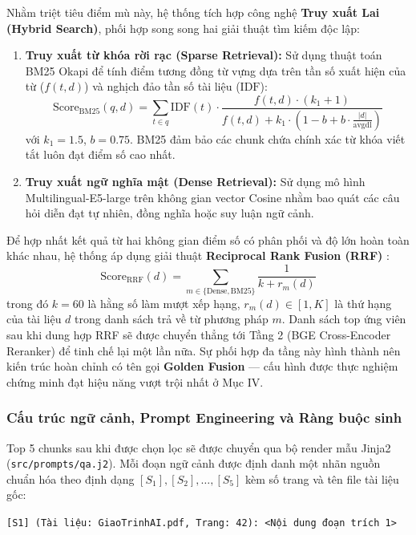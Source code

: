 ﻿\documentclass[12pt]{article}
\begin{document}
Nhằm triệt tiêu điểm mù này, hệ thống tích hợp công nghệ \textbf{Truy xuất Lai (Hybrid Search)}, phối hợp song song hai giải thuật tìm kiếm độc lập:
\begin{enumerate}
    \item \textbf{Truy xuất từ khóa rời rạc (Sparse Retrieval):} Sử dụng thuật toán BM25 Okapi \cite{robertson2009probabilistic} để tính điểm tương đồng từ vựng dựa trên tần số xuất hiện của từ ($f(t, d)$) và nghịch đảo tần số tài liệu ($\text{IDF}$):
    \begin{equation}
        \text{Score}_{\text{BM25}}(q, d) = \sum_{t \in q} \text{IDF}(t) \cdot \frac{f(t, d) \cdot (k_1 + 1)}{f(t, d) + k_1 \cdot \left(1 - b + b \cdot \frac{|d|}{\text{avgdl}}\right)}
    \end{equation}
    với $k_1 = 1.5$, $b = 0.75$. BM25 đảm bảo các chunk chứa chính xác từ khóa viết tắt luôn đạt điểm số cao nhất.
    \item \textbf{Truy xuất ngữ nghĩa mật (Dense Retrieval):} Sử dụng mô hình Multilingual-E5-large trên không gian vector Cosine nhằm bao quát các câu hỏi diễn đạt tự nhiên, đồng nghĩa hoặc suy luận ngữ cảnh.
\end{enumerate}

Để hợp nhất kết quả từ hai không gian điểm số có phân phối và độ lớn hoàn toàn khác nhau, hệ thống áp dụng giải thuật \textbf{Reciprocal Rank Fusion (RRF)} \cite{cormack2009reciprocal}:
\begin{equation}
    \text{Score}_{\text{RRF}}(d) = \sum_{m \in \{\text{Dense}, \text{BM25}\}} \frac{1}{k + r_m(d)}
\end{equation}
trong đó $k = 60$ là hằng số làm mượt xếp hạng, $r_m(d) \in [1, K]$ là thứ hạng của tài liệu $d$ trong danh sách trả về từ phương pháp $m$. Danh sách top ứng viên sau khi dung hợp RRF sẽ được chuyển thẳng tới Tầng 2 (BGE Cross-Encoder Reranker) để tinh chế lại một lần nữa. Sự phối hợp đa tầng này hình thành nên kiến trúc hoàn chỉnh có tên gọi \textbf{Golden Fusion} --- cấu hình được thực nghiệm chứng minh đạt hiệu năng vượt trội nhất ở Mục IV.

\subsubsection{Cấu trúc ngữ cảnh, Prompt Engineering và Ràng buộc sinh}
Top 5 chunks sau khi được chọn lọc sẽ được chuyển qua bộ render mẫu Jinja2 (\texttt{src/prompts/qa.j2}). Mỗi đoạn ngữ cảnh được định danh một nhãn nguồn chuẩn hóa theo định dạng $[S_1], [S_2], \dots, [S_5]$ kèm số trang và tên file tài liệu gốc:
\begin{center}
\texttt{[S1] (Tài liệu: GiaoTrinhAI.pdf, Trang: 42): <Nội dung đoạn trích 1>}
\end{center}
\end{document}
